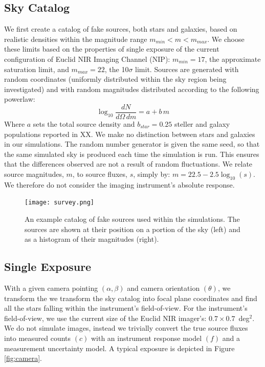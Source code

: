 \documentclass[manuscript]{aastex}
\begin{document}
\subsection{Sky Catalog}
We first create a catalog of fake sources, both stars and galaxies, based on realistic densities within the magnitude range $m_{min} < m < m_{max}$. We choose these limits based on the properties of single exposure of the current configuration of Euclid NIR Imaging Channel (NIP): $m_{min} = 17$, the approximate saturation limit, and $m_{max} = 22$, the 10$\sigma$ limit. Sources are generated with random coordinates (uniformly distributed within the sky region being investigated) and with random magnitudes distributed according to the following powerlaw:
\begin{displaymath}
\log_{10} \frac{dN}{d\Omega\,dm} = a + b\,m
\end{displaymath}
Where $a$ sets the total source density and $b_{star} = 0.25$ steller and galaxy populations reported in XX. We make no distinction between stars and galaxies in our simulations. The random number generator is given the same seed, so that the same simulated sky is produced each time the simulation is run. This ensures that the differences observed are not a result of random fluctuations. We relate source magnitudes, $m$, to source fluxes, $s$, simply by: $m = 22.5 - 2.5\log_{10}(s)$. We therefore do not consider the imaging instrument's absolute response.

\begin{figure}[ht]
\begin{center}
\texttt{[image: survey.png]}
\end{center}
\caption{An example catalog of fake sources used within the simulations. The sources are shown at their position on a portion of the sky (left) and as a histogram of their magnitudes (right).
\label{fig:sky}}
\end{figure}

\subsection{Single Exposure}
With a given camera pointing $(\alpha, \beta)$ and camera orientation $(\theta)$, we transform the we transform the sky catalog into focal plane coordinates and find all the stars falling within the instrument's field-of-view. For the instrument's field-of-view, we use the current size of the Euclid NIR imager's: $0.7 \times 0.7$~deg$^{2}$. We do not simulate images, instead we trivially convert the true source fluxes into measured counts $(c)$ with an instrument response model $(f)$ and a measurement uncertainty model. A typical exposure is depicted in Figure \ref{fig:camera}.
\end{document}
